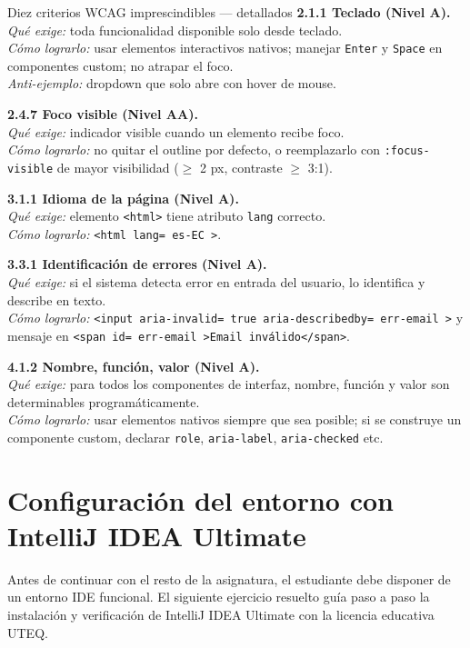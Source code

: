 \begin{cajabuenas}{Diez criterios WCAG imprescindibles --- detallados}
\textbf{2.1.1 Teclado (Nivel A).}\\
\emph{Qué exige:} toda funcionalidad disponible solo desde teclado.\\
\emph{Cómo lograrlo:} usar elementos interactivos nativos; manejar
\texttt{Enter} y \texttt{Space} en componentes custom; no atrapar el
foco.\\
\emph{Anti-ejemplo:} dropdown que solo abre con hover de mouse.

\textbf{2.4.7 Foco visible (Nivel AA).}\\
\emph{Qué exige:} indicador visible cuando un elemento recibe foco.\\
\emph{Cómo lograrlo:} no quitar el outline por defecto, o
reemplazarlo con \texttt{:focus-visible} de mayor visibilidad
($\geq$ 2 px, contraste $\geq$ 3:1).

\textbf{3.1.1 Idioma de la página (Nivel A).}\\
\emph{Qué exige:} elemento \texttt{<html>} tiene atributo
\texttt{lang} correcto.\\
\emph{Cómo lograrlo:} \texttt{<html lang= es-EC >}.

\textbf{3.3.1 Identificación de errores (Nivel A).}\\
\emph{Qué exige:} si el sistema detecta error en entrada del usuario,
lo identifica y describe en texto.\\
\emph{Cómo lograrlo:} \texttt{<input aria-invalid= true 
aria-describedby= err-email >} y mensaje en
\texttt{<span id= err-email >Email inválido</span>}.

\textbf{4.1.2 Nombre, función, valor (Nivel A).}\\
\emph{Qué exige:} para todos los componentes de interfaz, nombre,
función y valor son determinables programáticamente.\\
\emph{Cómo lograrlo:} usar elementos nativos siempre que sea posible;
si se construye un componente custom, declarar
\texttt{role}, \texttt{aria-label}, \texttt{aria-checked} etc.
\end{cajabuenas}

\section{Configuración del entorno con IntelliJ IDEA Ultimate}

Antes de continuar con el resto de la asignatura, el estudiante
debe disponer de un entorno IDE funcional. El siguiente ejercicio
resuelto guía paso a paso la instalación y verificación de IntelliJ
IDEA Ultimate con la licencia educativa UTEQ.


